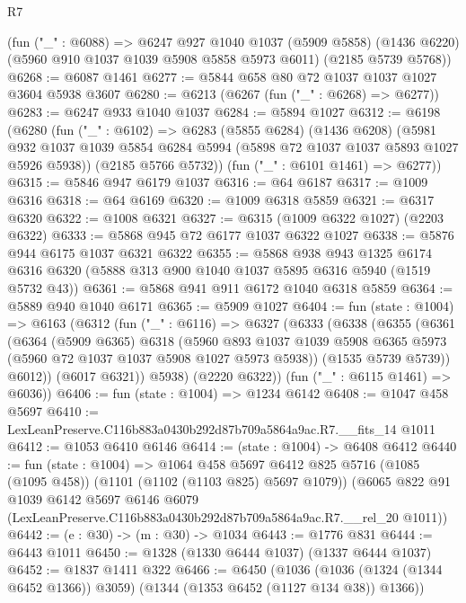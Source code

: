 \begin{lexlean}{R7}
\begin{coremodule}
    (fun ("_" : @6088) =>
    @6247
      @927
      @1040
      @1037
      (@5909 @5858)
      (@1436 @6220)
      (@5960 @910 @1037 @1039 @5908 @5858 @5973 @6011)
      (@2185 @5739 @5768))
@6268 := @6087 @1461
@6277 := @5844 @658 @80 @72 @1037 @1037 @1027 @3604 @5938 @3607
@6280 := @6213 (@6267 (fun ("_" : @6268) => @6277))
@6283 := @6247 @933 @1040 @1037
@6284 := @5894 @1027
@6312 := @6198
    (@6280
      (fun ("_" : @6102) =>
      @6283
        (@5855 @6284)
        (@1436 @6208)
        (@5981 @932 @1037 @1039 @5854 @6284 @5994 (@5898 @72 @1037 @1037 @5893 @1027 @5926 @5938))
        (@2185 @5766 @5732))
      (fun ("_" : @6101 @1461) => @6277))
@6315 := @5846 @947 @6179 @1037
@6316 := @64 @6187
@6317 := @1009 @6316
@6318 := @64 @6169
@6320 := @1009 @6318 @5859
@6321 := @6317 @6320
@6322 := @1008 @6321
@6327 := @6315 (@1009 @6322 @1027) (@2203 @6322)
@6333 := @5868 @945 @72 @6177 @1037 @6322 @1027
@6338 := @5876 @944 @6175 @1037 @6321 @6322
@6355 := @5868
    @938
    @943
    @1325
    @6174
    @6316
    @6320
    (@5888 @313 @900 @1040 @1037 @5895 @6316 @5940 (@1519 @5732 @43))
@6361 := @5868 @941 @911 @6172 @1040 @6318 @5859
@6364 := @5889 @940 @1040 @6171
@6365 := @5909 @1027
@6404 := fun (state : @1004) =>
  @6163
    (@6312
      (fun ("_" : @6116) =>
      @6327
        (@6333
          (@6338
            (@6355
              (@6361
                (@6364
                  (@5909 @6365)
                  @6318
                  (@5960
                    @893
                    @1037
                    @1039
                    @5908
                    @6365
                    @5973
                    (@5960 @72 @1037 @1037 @5908 @1027 @5973 @5938))
                  (@1535 @5739 @5739))
                @6012))
            (@6017 @6321))
          @5938)
        (@2220 @6322))
      (fun ("_" : @6115 @1461) => @6036))
@6406 := fun (state : @1004) => @1234 @6142
@6408 := @1047 @458 @5697
@6410 := LexLeanPreserve.C116b883a0430b292d87b709a5864a9ac.R7.__fits_14 @1011
@6412 := @1053 @6410 @6146
@6414 := (state : @1004) -> @6408 @6412
@6440 := fun (state : @1004) =>
  @1064
    @458
    @5697
    @6412
    @825
    @5716
    (@1085 (@1095 @458))
    (@1101 (@1102 (@1103 @825) @5697 @1079))
    (@6065
      @822
      @91
      @1039
      @6142
      @5697
      @6146
      @6079
      (LexLeanPreserve.C116b883a0430b292d87b709a5864a9ac.R7.__rel_20 @1011))
@6442 := (e : @30) -> (m : @30) -> @1034
@6443 := @1776 @831
@6444 := @6443 @1011
@6450 := @1328 (@1330 @6444 @1037) (@1337 @6444 @1037)
@6452 := @1837 @1411 @322
@6466 := @6450
    (@1036 (@1036 (@1324 (@1344 @6452 @1366)) @3059) (@1344 (@1353 @6452 (@1127 @134 @38)) @1366))

\end{coremodule}
\end{lexlean}
